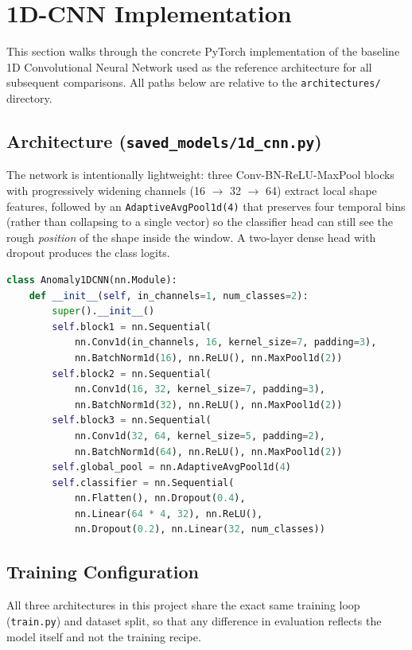 \section{1D-CNN Implementation}

This section walks through the concrete PyTorch implementation of the baseline 1D Convolutional Neural Network used as the reference architecture for all subsequent comparisons. All paths below are relative to the \texttt{architectures/} directory.

\subsection{Architecture (\texttt{saved\_models/1d\_cnn.py})}

The network is intentionally lightweight: three Conv-BN-ReLU-MaxPool blocks with progressively widening channels (16 \(\rightarrow\) 32 \(\rightarrow\) 64) extract local shape features, followed by an \texttt{AdaptiveAvgPool1d(4)} that preserves four temporal bins (rather than collapsing to a single vector) so the classifier head can still see the rough \emph{position} of the shape inside the window. A two-layer dense head with dropout produces the class logits.

\begin{lstlisting}[language=Python]
class Anomaly1DCNN(nn.Module):
    def __init__(self, in_channels=1, num_classes=2):
        super().__init__()
        self.block1 = nn.Sequential(
            nn.Conv1d(in_channels, 16, kernel_size=7, padding=3),
            nn.BatchNorm1d(16), nn.ReLU(), nn.MaxPool1d(2))
        self.block2 = nn.Sequential(
            nn.Conv1d(16, 32, kernel_size=7, padding=3),
            nn.BatchNorm1d(32), nn.ReLU(), nn.MaxPool1d(2))
        self.block3 = nn.Sequential(
            nn.Conv1d(32, 64, kernel_size=5, padding=2),
            nn.BatchNorm1d(64), nn.ReLU(), nn.MaxPool1d(2))
        self.global_pool = nn.AdaptiveAvgPool1d(4)
        self.classifier = nn.Sequential(
            nn.Flatten(), nn.Dropout(0.4),
            nn.Linear(64 * 4, 32), nn.ReLU(),
            nn.Dropout(0.2), nn.Linear(32, num_classes))
\end{lstlisting}

\subsection{Training Configuration}

All three architectures in this project share the exact same training loop (\texttt{train.py}) and dataset split, so that any difference in evaluation reflects the model itself and not the training recipe.

